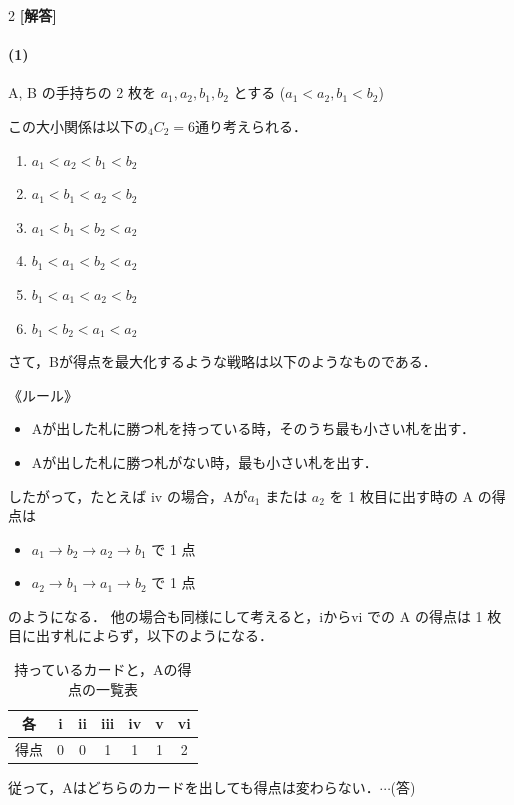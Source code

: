 \documentclass[../../main.tex]{subfiles}
\begin{document}
\setcounter{equation}{0}
\begin{oframed}
  
\end{oframed}
\setlength{\columnseprule}{0.4pt}
\begin{multicols}{2}
  {\bf [解答]}

  \paragraph{(1)}
  A, B の手持ちの 2 枚を $a_1, a_2, b_1, b_2$ とする ($a_1 < a_2, b_1 < b_2$)

  この大小関係は以下の${}_4C_2=6$通り考えられる．
  \begin{enumerate}[i]
    \item  $a_1 < a_2 < b_1 < b_2$
    \item  $a_1 < b_1 < a_2 < b_2$
    \item  $a_1 < b_1 < b_2 < a_2$
    \item  $b_1 < a_1 < b_2 < a_2$
    \item  $b_1 < a_1 < a_2 < b_2$
    \item  $b_1 < b_2 < a_1 < a_2$
  \end{enumerate}

  さて，Bが得点を最大化するような戦略は以下のようなものである．

  《ルール》
  \begin{itemize}
    \item Aが出した札に勝つ札を持っている時，そのうち最も小さい札を出す．
    \item Aが出した札に勝つ札がない時，最も小さい札を出す．
  \end{itemize}

  したがって，たとえば iv の場合，Aが$a_1$ または $a_2$ を 1 枚目に出す時の A の得点は
  \begin{itemize}
    \item $a_1 \to b_2 \to a_2 \to b_1$ で 1 点
    \item $a_2 \to b_1 \to a_1 \to b_2$ で 1 点
  \end{itemize}
  のようになる．
  他の場合も同様にして考えると，iからvi での A の得点は 1 枚目に出す札によらず，以下のようになる．
  \begin{table}[H]
    \centering
    \caption{持っているカードと，Aの得点の一覧表}
    \label{1995-3:table:1}
    \begin{tabular}{|c|c|c|c|c|c|c|}
      \hline
      各  & i & ii & iii & iv & v & vi \\
      \hline
      得点 & 0 & 0  & 1   & 1  & 1 & 2  \\
      \hline
    \end{tabular}
  \end{table}
  従って，Aはどちらのカードを出しても得点は変わらない．$\cdots$(答)


\end{multicols}
\end{document}
